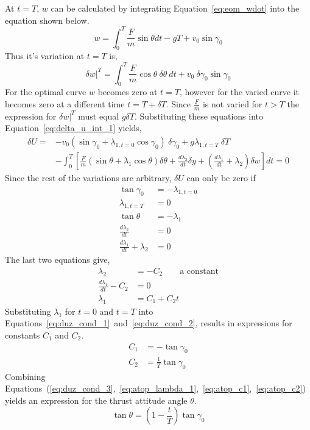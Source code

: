 At $t=T$, $w$ can be calculated by integrating Equation~\eqref{eq:eom_wdot} into the equation shown below.
\begin{equation}
    w = \int_0^T\frac{F}{m} \sin{\theta} dt - gT+ v_0 \sin \gamma_0
\end{equation}
Thus it's variation at $t=T$ is,
\begin{equation}
    \delta w \bigg|^T= \int_0^T\frac{F}{m} \cos{\theta}\ \delta \theta\ dt + v_0\ \delta \gamma_0 \sin \gamma_0
\end{equation}
For the optimal curve $w$ becomes zero at $t=T$, however for the varied curve it becomes zero at a different time $t=T+\delta T$. Since $\frac{F}{m}$ is not varied for $t>T$ the expression for $\delta w |^T$ must equal $g\delta T$. Substituting these equations into Equation~\eqref{eq:delta_u_int_1} yields,
\begin{align}
    \delta U= &-v_0 (\sin \gamma_0 + \lambda_{1,t=0}\cos\gamma_0)\ \delta \gamma_0 + g\lambda_{1,t=T}\ \delta T  \\
    &- \int_0^T\left[\frac{F}{m} \left(\sin{\theta} + \lambda_1\cos{\theta}\right) \delta \theta
    + \frac{d\lambda_2}{dt} \delta y 
    + \left(\frac{d\lambda_1}{dt} + \lambda_2\right) \delta w\right] dt = 0  \nonumber
\end{align}
Since the rest of the variations are arbitrary, $\delta U$ can only be zero if
\begin{align}
    \tan \gamma_0 &=-\lambda_{1, t=0} \label{eq:duz_cond_1}  \\     
    \lambda_{1, t=T} &= 0  \label{eq:duz_cond_2} \\
    \tan{\theta} &= -\lambda_1 \label{eq:duz_cond_3} \\ 
    \frac{d\lambda_2}{dt}&= 0 \label{eq:duz_cond_4} \\
    \frac{d\lambda_1}{dt} + \lambda_2 &= 0 \label{eq:duz_cond_5}
\end{align}
The last two equations give,
\begin{align}
    \lambda_2&=-C_2\qquad\text{a constant} \\
    \frac{d\lambda_1}{dt} - C_2 &= 0 \\
    \lambda_1 &= C_1 + C_2 t \label{eq:atop_lambda_1}
\end{align}
Substituting $\lambda_1$ for $t=0$ and $t=T$ into Equations~\eqref{eq:duz_cond_1}~and~\eqref{eq:duz_cond_2}, results in expressions for constants $C_1$ and $C_2$.
\begin{align}
    C_1 &=-\tan{\gamma_0} \label{eq:atop_c1}\\
    C_2 &=\frac{1}{T}\tan{\gamma_0} \label{eq:atop_c2}
\end{align}
Combining Equations~(\ref{eq:duz_cond_3},~\ref{eq:atop_lambda_1},~\ref{eq:atop_c1},~\ref{eq:atop_c2}) yields an expression for the thrust attitude angle $\theta$. 
\begin{equation}
    \label{eq:optimal_theta_1}
    \tan {\theta} = \left(1-\frac{t}{T}\right)\tan{\gamma_0}
\end{equation}

